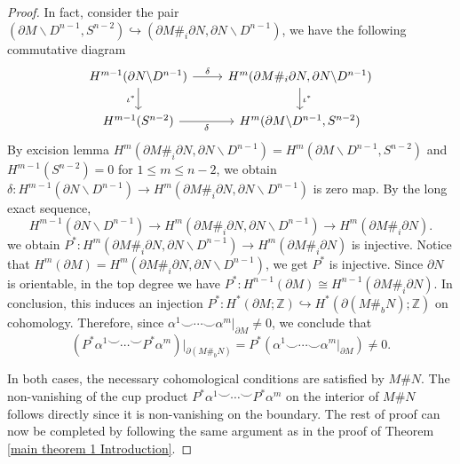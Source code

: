 \documentclass[11pt,letterpaper]{amsart}
\theoremstyle{definition}
\theoremstyle{remark}
\numberwithin{equation}{section}
\begin{document}
\begin{proof}
     In fact, consider the pair $(\partial M \backslash D^{n-1},S^{n-2})\hookrightarrow(\partial M\#_{i}\partial N,\partial N\backslash D^{n-1})$, we have the following commutative diagram
    \[
    \begin{tikzcd}
    H^{m-1}(\partial N\backslash D^{n-1}) \arrow[r, "\delta"] \arrow[d, swap, "\iota^{*}"] & H^{m}(\partial M\#_{i}\partial N,\partial N\backslash D^{n-1}) \arrow[d, "\iota^{*}"] \\
    H^{m-1}(S^{n-2}) \arrow[r, swap, "\delta"] & H^{m}(\partial M \backslash D^{n-1},S^{n-2})
    \end{tikzcd}
    \]
    By excision lemma $H^{m}(\partial M\#_{i}\partial N,\partial N\backslash D^{n-1})=H^{m}(\partial M \backslash D^{n-1},S^{n-2})$ and $H^{m-1}(S^{n-2})=0$ for $1\leq m\leq n-2$, we obtain $\delta:H^{m-1}(\partial N\backslash D^{n-1})\rightarrow H^{m}(\partial M\#_{i}\partial N,\partial N\backslash D^{n-1})$ is zero map. By the long exact sequence,
    \[
     H^{m-1}(\partial N\backslash D^{n-1})\rightarrow H^{m}(\partial M\#_{i}\partial N,\partial N\backslash D^{n-1})\rightarrow H^{m}(\partial M\#_{i}\partial N).
    \]
    we obtain $P^{*}:H^{m}(\partial M\#_{i}\partial N,\partial N\backslash D^{n-1})\rightarrow H^{m}(\partial M\#_{i}\partial N)$ is injective. Notice that $H^{m}(\partial M) = H^{m}(\partial M\#_{i}\partial N,\partial N\backslash D^{n-1})$, we get $P^{*}$ is injective.
    Since $\partial N$ is orientable, in the top degree we have $P^*:H^{n-1}(\partial M) \cong H^{n-1}(\partial M \#_i \partial N)$. In conclusion, this induces an injection $P^*: H^*(\partial M; \mathbb{Z}) \hookrightarrow H^*(\partial(M \#_b N); \mathbb{Z})$ on cohomology. Therefore, since $\alpha^1 \smile \cdots \smile \alpha^m|_{\partial M} \neq 0$, we conclude that
    \[
    (P^*\alpha^1 \smile \cdots \smile P^*\alpha^m)|_{\partial(M \#_b N)} = P^*(\alpha^1 \smile \cdots \smile \alpha^m|_{\partial M}) \neq 0.
    \]

    In both cases, the necessary cohomological conditions are satisfied by $M \# N$. The non-vanishing of the cup product $P^*\alpha^1 \smile \cdots \smile P^*\alpha^m$ on the interior of $M \# N$ follows directly since it is non-vanishing on the boundary. The rest of proof can now be completed by following the same argument as in the proof of Theorem \ref{main theorem 1 Introduction}.
\end{proof}
\end{document}
